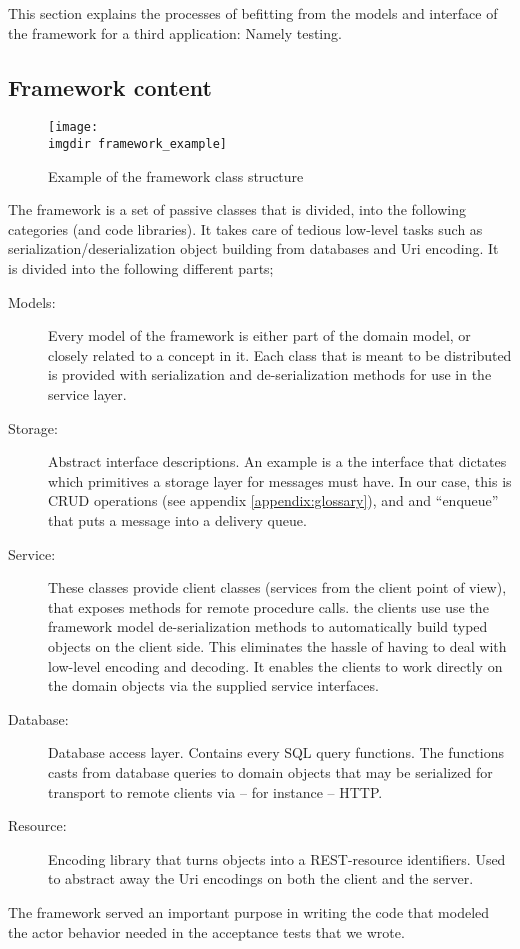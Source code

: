 \noindent This section explains the processes of befitting from the models and interface of the framework for a third application: Namely testing. 

\subsection{Framework content}
\label{ssec:openreception-framework-content}

\begin{figure}[!htbp]
\texttt{[image: \\imgdir framework\_example]}
\centering
\caption{Example of the framework class structure}
\label{fig:framework_example}
\end{figure}
\noindent
The framework is a set of passive classes that is divided, into the following categories (and code libraries). It takes care of tedious low-level tasks such as serialization/deserialization object building from databases and Uri encoding. It is divided into the following different parts;
\begin{description}
  \item[Models:] Every model of the framework is either part of the domain model, or closely related to a concept in it. Each class that is meant to be distributed is provided with serialization and de-serialization methods for use in the service layer.
  \item[Storage:] Abstract interface descriptions. An example is a the interface that dictates which primitives a storage layer for messages must have. In our case, this is CRUD operations (see appendix \ref{appendix:glossary}), and and ``enqueue'' that puts a message into a delivery queue.
  \item[Service:] These classes provide client classes (services from the client point of view), that exposes methods for remote procedure calls. the clients use  use the framework model de-serialization methods to automatically build typed objects on the client side. This eliminates the hassle of having to deal with low-level encoding and decoding. It enables the clients to work directly on the domain objects via the supplied service interfaces.
  \item[Database:] Database access layer. Contains every SQL query functions. The functions casts from database queries to domain objects that may be serialized for transport to remote clients via -- for instance -- HTTP.
  \item[Resource:] Encoding library that turns objects into a REST-resource identifiers. Used to abstract away the Uri encodings on both the client and the server.
\end{description}
The framework served an important purpose in writing the code that modeled the actor behavior needed in the acceptance tests that we wrote.
